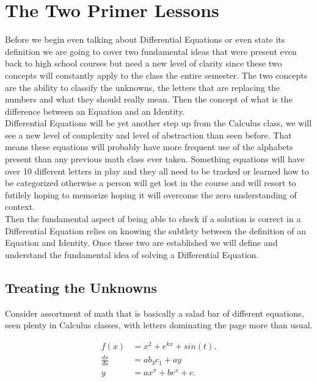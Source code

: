 \documentclass[12pt]{article}
\begin{document}
\pagebreak

\section{The Two Primer Lessons}

Before we begin even talking about Differential Equations or even state its definition we are going to cover two fundamental ideas that were present even back to high school courses but need a new level of clarity since these two concepts will constantly apply to the class the entire semester. The two concepts are the ability to classify the unknowns, the letters that are replacing the numbers and what they should really mean. Then the concept of what is the difference between an Equation and an Identity. \\

Differential Equations will be yet another step up from the Calculus class, we will see a new level of complexity and level of abstraction than seen before. That means these equations will probably have more frequent use of the alphabets present than any previous math class ever taken. Something equations will have over 10 different letters in play and they all need to be tracked or learned how to be categorized otherwise a person will get lost in the course and will resort to futilely hoping to memorize hoping it will overcome the zero understanding of context. \\

Then the fundamental aspect of being able to check if a solution is correct in a Differential Equation relies on knowing the subtlety between the definition of an Equation and Identity. Once these two are established we will define and understand the fundamental idea of solving a Differential Equation.

\subsection{Treating the Unknowns}

Consider assortment of math that is basically a salad bar of different equations, seen plenty in Calculus classes, with letters dominating the page more than usual. 

\begin{align*}
    f(x) &= x^2+e^{kx}+sin(t). \\
    \frac{dx}{da} &= ab_3c_1+ay \\
    y &= ax^\pi+be^x+c.
\end{align*}
\end{document}
